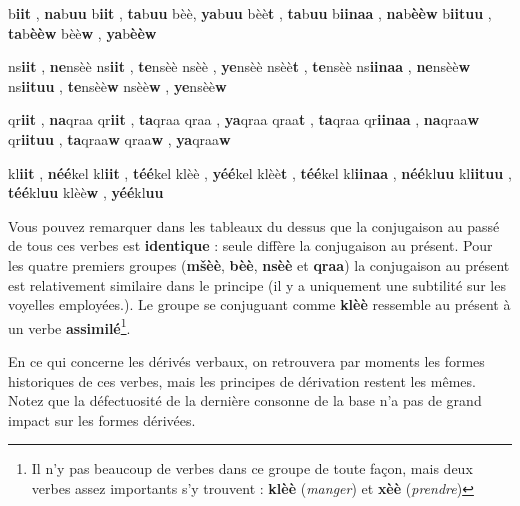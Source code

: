     {\textcrh b\textbf{iit} , \textbf{na}\textcrh b\textbf{uu}}
    {\textcrh b\textbf{iit} , \textbf{ta}\textcrh b\textbf{uu}}
    {\textcrh bèè, \textbf{ya}\textcrh b\textbf{uu}}
    {\textcrh bèè\textbf{t} , \textbf{ta}\textcrh b\textbf{uu}}
    {\textcrh b\textbf{iinaa} , \textbf{na}\textcrh b\textbf{èèw}}
    {\textcrh b\textbf{iituu} , \textbf{ta}\textcrh b\textbf{èèw}}
    {\textcrh bèè\textbf{w} , \textbf{ya}\textcrh b\textbf{èèw}}
    
    {ns\textbf{iit} , \textbf{ne}nsèè}
    {ns\textbf{iit} , \textbf{te}nsèè}
    {nsèè , \textbf{ye}nsèè}
    {nsèè\textbf{t} , \textbf{te}nsèè}
    {ns\textbf{iinaa} , \textbf{ne}nsèè\textbf{w}}
    {ns\textbf{iituu} , \textbf{te}nsèè\textbf{w}}
    {nsèè\textbf{w} , \textbf{ye}nsèè\textbf{w}}

    {qr\textbf{iit} , \textbf{na}qraa}
    {qr\textbf{iit} , \textbf{ta}qraa}
    {qraa , \textbf{ya}qraa}
    {qraa\textbf{t} , \textbf{ta}qraa}
    {qr\textbf{iinaa} , \textbf{na}qraa\textbf{w}}
    {qr\textbf{iituu} , \textbf{ta}qraa\textbf{w}}
    {qraa\textbf{w} , \textbf{ya}qraa\textbf{w}}

    {kl\textbf{iit} , \textbf{néé}kel}
    {kl\textbf{iit} , \textbf{téé}kel}
    {klèè , \textbf{yéé}kel}
    {klèè\textbf{t} , \textbf{téé}kel}
    {kl\textbf{iinaa} , \textbf{néé}kl\textbf{uu}}
    {kl\textbf{iituu} , \textbf{téé}kl\textbf{uu}}
    {klèè\textbf{w} , \textbf{yéé}kl\textbf{uu}}

Vous pouvez remarquer dans les tableaux du dessus que la conjugaison au passé de tous ces verbes est \textbf{identique} : seule diffère la conjugaison au présent. Pour les quatre premiers groupes (\textbf{m\v{s}èè}, \textbf{\textcrh bèè}, \textbf{nsèè} et \textbf{qraa}) la conjugaison au présent est relativement similaire dans le principe (il y a uniquement une subtilité sur les voyelles employées.). Le groupe se conjuguant comme \textbf{klèè} ressemble au présent à un verbe \textbf{assimilé}\footnote{Il n'y pas beaucoup de verbes dans ce groupe de toute façon, mais deux verbes assez importants s'y trouvent : \textbf{klèè} (\textit{manger}) et \textbf{x\dh èè} (\textit{prendre})}.

En ce qui concerne les dérivés verbaux, on retrouvera par moments les formes historiques de ces verbes, mais les principes de dérivation restent les mêmes. Notez que la défectuosité de la dernière consonne de la base n'a pas de grand impact sur les formes dérivées.

